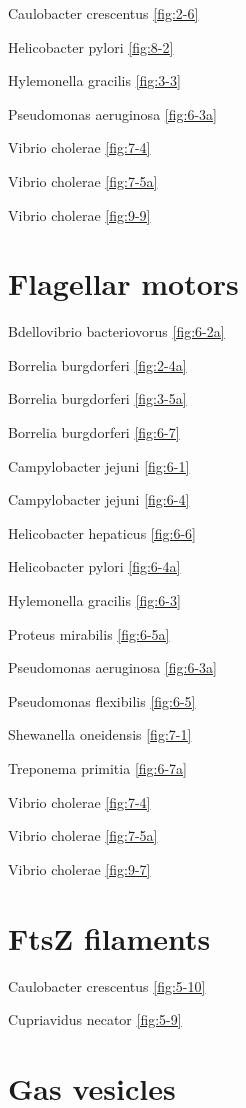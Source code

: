 \documentclass[]{tufte-book}
\begin{document}
Caulobacter crescentus \ref{fig:2-6}

Helicobacter pylori \ref{fig:8-2}

Hylemonella gracilis \ref{fig:3-3}

Pseudomonas aeruginosa \ref{fig:6-3a}

Vibrio cholerae \ref{fig:7-4}

Vibrio cholerae \ref{fig:7-5a}

Vibrio cholerae \ref{fig:9-9}

\section*{Flagellar motors}\label{flagellar-motors}

Bdellovibrio bacteriovorus \ref{fig:6-2a}

Borrelia burgdorferi \ref{fig:2-4a}

Borrelia burgdorferi \ref{fig:3-5a}

Borrelia burgdorferi \ref{fig:6-7}

Campylobacter jejuni \ref{fig:6-1}

Campylobacter jejuni \ref{fig:6-4}

Helicobacter hepaticus \ref{fig:6-6}

Helicobacter pylori \ref{fig:6-4a}

Hylemonella gracilis \ref{fig:6-3}

Proteus mirabilis \ref{fig:6-5a}

Pseudomonas aeruginosa \ref{fig:6-3a}

Pseudomonas flexibilis \ref{fig:6-5}

Shewanella oneidensis \ref{fig:7-1}

Treponema primitia \ref{fig:6-7a}

Vibrio cholerae \ref{fig:7-4}

Vibrio cholerae \ref{fig:7-5a}

Vibrio cholerae \ref{fig:9-7}

\section*{FtsZ filaments}\label{ftsz-filaments}

Caulobacter crescentus \ref{fig:5-10}

Cupriavidus necator \ref{fig:5-9}

\section*{Gas vesicles}\label{gas-vesicles}
\end{document}
